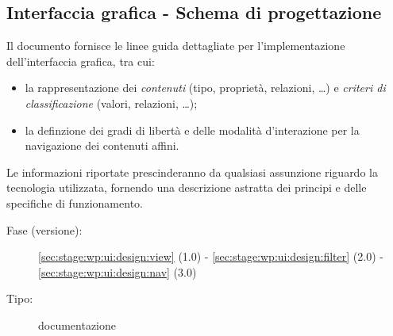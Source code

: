 \documentclass[10pt,a4paper,hidelinks]{scrartcl} %
\begin{document}
	\subsection{Interfaccia grafica - Schema di progettazione}
	Il documento fornisce le linee guida dettagliate per l'implementazione dell'interfaccia grafica, tra cui:
	\begin{itemize}
	\item la rappresentazione dei \textit{contenuti} (tipo, proprietà, relazioni, \ldots) e \textit{criteri di classificazione} (valori, relazioni, \ldots);
	\item la definzione dei gradi di libertà e delle modalità d'interazione per la navigazione dei contenuti affini.
	\end{itemize}
	Le informazioni riportate prescinderanno da qualsiasi assunzione riguardo la tecnologia utilizzata, fornendo una descrizione astratta dei principi e delle specifiche di funzionamento.
	\label{sec:stage:prod:ui:design}
	\begin{description}
	\item[Fase (versione):] \ref{sec:stage:wp:ui:design:view} (1.0) - \ref{sec:stage:wp:ui:design:filter} (2.0) - \ref{sec:stage:wp:ui:design:nav} (3.0)
	\item[Tipo:] documentazione
	\end{description}

\end{document}
